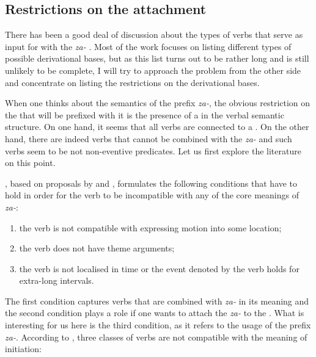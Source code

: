 \subsection{Restrictions on the attachment}
There has been a good deal of discussion about the types of verbs that serve as input for  with the  \textit{za-} \citep{Isachenko:60, Zemskaja:55, Sheljakin:69, Zaliznjak:95, Braginsky:08}. Most of the work focuses on listing different types of possible derivational bases, but as this list turns out to be rather long and is still unlikely to be complete, I will try to approach the problem from the other side and concentrate on listing the restrictions on the derivational bases.

When one thinks about the  semantics of the prefix \textit{za-}, the obvious restriction on the  that will be prefixed with it is the presence of a  in the verbal semantic structure. On one hand, it seems that all verbs are connected to a . On the other hand, there are indeed verbs that cannot be combined with the  \textit{za-} and such verbs seem to be not non-eventive predicates. Let us first explore the literature on this point.

\citet[275]{Braginsky:08}, based on proposals by \citet{Sheljakin:69} and \citet{Paducheva:96}, formulates the following conditions that have to hold in order for the verb to be incompatible with any of the core meanings of \textit{za-}:
\begin{enumerate}
\item the verb is not compatible with expressing motion into some location;
\item the verb does not have theme arguments;
\item the verb is not localised in time or the event denoted by the verb holds for extra-long intervals.
\end{enumerate}

The first condition captures verbs that are combined with \textit{za-} in its  meaning and the second condition plays a role if one wants to attach the  \textit{za-} to the . What is interesting for us here is the third condition, as it refers to the  usage of the prefix \textit{za-}. According to \citet{Paducheva:96}, three classes of verbs are not compatible with the meaning of initiation:

